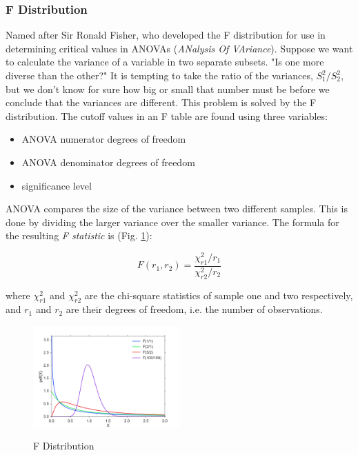 \subsubsection{F Distribution}
Named after Sir Ronald Fisher, who developed the F distribution for use in determining critical values in ANOVAs (\emph{ANalysis Of VAriance}).
Suppose we want to calculate the variance of a variable in two separate subsets. "Is one more diverse than the other?" It is tempting to take the ratio of the variances, $S_1^2 / S_2^2$, but we don't know for sure how big or small that number must be before we conclude that the variances are different. This problem is solved by the F distribution. The cutoff values in an F table are found using three variables:

\begin{itemize}
  \item ANOVA numerator degrees of freedom
  \item ANOVA denominator degrees of freedom
  \item significance level
\end{itemize}

ANOVA compares the size of the variance between two different samples. This is done by dividing the larger variance over the smaller variance. The formula for the resulting \emph{F statistic} is (Fig. \ref{fig:Fdistribution}):

\begin{equation}
    F(r_1, r_2) = \frac{\chi_{r1} ^2 /r_1}{\chi_{r2} ^2 /r_2}
\end{equation}

where $\chi_{r1}^2$ and $\chi_{r2}^2$ are the chi-square statistics of sample one and two respectively, and $r_1$ and $r_2$ are their degrees of freedom, i.e. the number of observations.

\begin{figure}
  \centering
  \includegraphics[width=0.5\textwidth]{../Images/dist_f.png}\\
  \caption{F Distribution}
  \label{fig:Fdistribution}
\end{figure}


